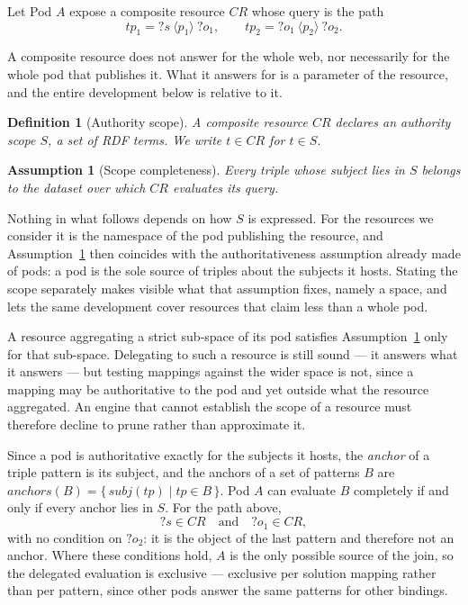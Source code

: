\documentclass{article}
\newtheorem{definition}{Definition}
\newtheorem{assumption}{Assumption}
\begin{document}
Let Pod $A$ expose a composite resource $CR$ whose query is the path
\[
tp_1 = {?s}\ \langle p_1\rangle\ {?o_1}, \qquad
tp_2 = {?o_1}\ \langle p_2\rangle\ {?o_2}.
\]

A composite resource does not answer for the whole web, nor necessarily for the whole
pod that publishes it. What it answers for is a parameter of the resource, and the entire
development below is relative to it.

\begin{definition}[Authority scope]
A composite resource $CR$ declares an \emph{authority scope} $S$, a set of RDF terms. We
write $t \in CR$ for $t \in S$.
\end{definition}

\begin{assumption}[Scope completeness]
\label{as:scope}
Every triple whose subject lies in $S$ belongs to the dataset over which $CR$ evaluates
its query.
\end{assumption}

Nothing in what follows depends on how $S$ is expressed. For the resources we consider it
is the namespace of the pod publishing the resource, and Assumption~\ref{as:scope} then
coincides with the authoritativeness assumption already made of pods: a pod is the sole
source of triples about the subjects it hosts. Stating the scope separately makes visible
what that assumption fixes, namely a space, and lets the same development cover resources
that claim less than a whole pod.

A resource aggregating a strict sub-space of its pod satisfies
Assumption~\ref{as:scope} only for that sub-space. Delegating to such a resource is still
sound --- it answers what it answers --- but testing mappings against the wider space is
not, since a mapping may be authoritative to the pod and yet outside what the resource
aggregated. An engine that cannot establish the scope of a resource must therefore
decline to prune rather than approximate it.

Since a pod is authoritative exactly for the subjects it hosts, the \emph{anchor} of a
triple pattern is its subject, and the anchors of a set of patterns $B$ are
$\mathit{anchors}(B) = \{\, \mathit{subj}(tp) \mid tp \in B \,\}$. Pod $A$ can evaluate
$B$ completely if and only if every anchor lies in $S$. For the path above,
\[
{?s} \in CR \quad\text{and}\quad {?o_1} \in CR ,
\]
with no condition on $?o_2$: it is the object of the last pattern and therefore not an
anchor. Where these conditions hold, $A$ is the only possible source of the join, so
the delegated evaluation is exclusive --- exclusive per solution mapping rather than per
pattern, since other pods answer the same patterns for other bindings.
\end{document}
